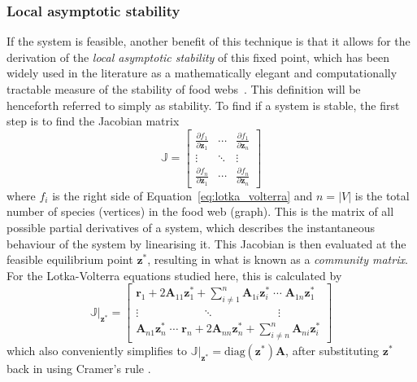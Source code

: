 \subsubsection{Local asymptotic stability}
If the system is feasible, another benefit of this technique is that it allows for the derivation of the \emph{local asymptotic stability} of this fixed point, which has been widely used in the literature as a mathematically elegant and computationally tractable measure of the stability of food webs~\cite{May1973, Emmerson2004}. This definition will be henceforth referred to simply as stability. 
To find if a system is stable, the first step is to find the Jacobian matrix
\begin{equation}
  \mathbb{J} = \begin{bmatrix}
    \frac{\partial f_1}{\partial \mathbf{z}_1} & 
    \cdots &
    \frac{\partial f_1}{\partial \mathbf{z}_n} \\
    \vdots &
    \ddots &
    \vdots \\
    \frac{\partial f_n}{\partial \mathbf{z}_1} & 
    \cdots &
    \frac{\partial f_n}{\partial \mathbf{z}_n}
  \end{bmatrix}
\end{equation}
where $f_i$ is the right side of Equation~\eqref{eq:lotka_volterra} and $n=|V|$ is the total number of species (vertices) in the food web (graph).
This is the matrix of all possible partial derivatives of a system, which describes the instantaneous behaviour of the system by linearising it. This Jacobian is then evaluated at the feasible equilibrium point $\mathbf{z}^*$, resulting in what is known as a \emph{community matrix}. For the Lotka-Volterra equations studied here, this is calculated by
\begin{equation}
  \mathbb{J}|_\mathbf{z^*} = \begin{bmatrix}
    \mathbf{r}_1 + 2\mathbf{A}_{11}\mathbf{z}_1^* + \sum_{i\neq 1}^n\mathbf{A}_{1i}\mathbf{z}_i^*
    \;\cdots\;
    \mathbf{A}_{1n}\mathbf{z}_1^*\\
    \vdots 
    \qquad\qquad\quad\;\;\ddots\qquad\qquad\quad\;\;
    \vdots \\
    \mathbf{A}_{n1}\mathbf{z}_n^*
    \;\cdots\;
    \mathbf{r}_n + 2\mathbf{A}_{nn}\mathbf{z}_n^* + \sum_{i\neq n}^n\mathbf{A}_{ni}\mathbf{z}_i^* 
  \end{bmatrix}
  \label{eq:jacobian_evaluated}
\end{equation}
which also conveniently simplifies to $\mathbb{J}|_\mathbf{z^*} = \mathrm{diag}(\mathbf{z^*})\mathbf{A}$, after substituting $\mathbf{z^*}$ back in using Cramer's rule \cite{May1973}.
